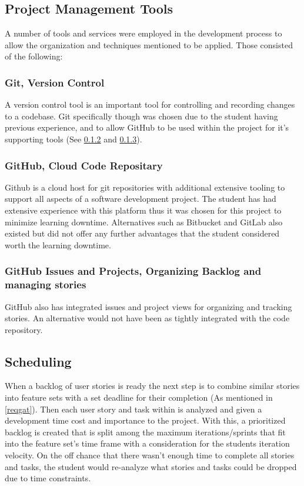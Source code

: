 \subsection{Project Management Tools} \label{projectmanage}
A number of tools and services were employed in the development process to allow the organization and techniques mentioned to be applied. Those consisted of the following:

\subsubsection{Git, Version Control}
A version control tool is an important tool for controlling and recording changes to a codebase.
Git specifically though was chosen due to the student having previous experience, and to allow GitHub to be used within the project for it's supporting tools (See \ref{github} and \ref{github2}).

\subsubsection{GitHub, Cloud Code Repositary} \label{github}
Github is a cloud host for git repositories with additional extensive tooling to support all aspects of a software development project. The student has had extensive experience with this platform thus it was chosen for this project to minimize learning downtime. Alternatives such as Bitbucket and GitLab also existed but did not offer any further advantages that the student considered worth the learning downtime.

\subsubsection{GitHub Issues and Projects, Organizing Backlog and managing stories} \label{github2}
GitHub also has integrated issues and project views for organizing and tracking stories. An alternative would not have been as tightly integrated with the code repository.

\subsection{Scheduling} \label{scheduling}
When a backlog of user stories is ready the next step is to combine similar stories into feature sets with a set deadline for their completion (As mentioned in \ref{reqgat}). Then each user story and task within is analyzed and given a development time cost and importance to the project. With this, a prioritized backlog is created that is split among the maximum iterations/sprints that fit into the feature set's time frame with a consideration for the students iteration velocity. On the off chance that there wasn't enough time to complete all stories and tasks, the student would re-analyze what stories and tasks could be dropped due to time constraints.

